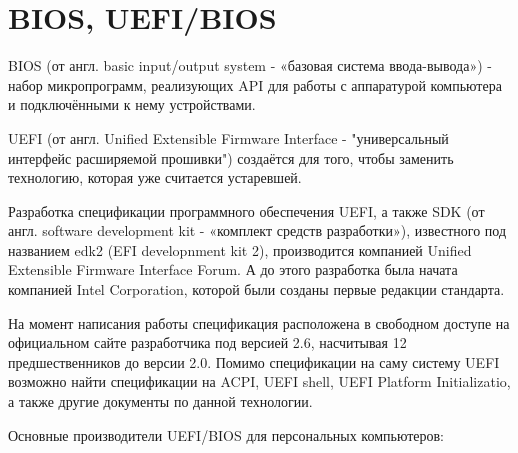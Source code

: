\section{BIOS, UEFI/BIOS}
BIOS (от англ. basic input/output system - «базовая система ввода-вывода») - 
набор микропрограмм,
реализующих API для работы с аппаратурой компьютера и подключёнными к нему устройствами.

UEFI (от англ. Unified Extensible Firmware Interface - "универсальный интерфейс расширяемой прошивки") создаётся для того,
чтобы заменить технологию,
	которая уже считается устаревшей.

Разработка спецификации программного обеспечения UEFI,
а также SDK (от англ. software development kit - «комплект средств разработки»),
	известного под названием edk2 (EFI developnment kit 2),
производится компанией Unified Extensible Firmware Interface Forum. 
А до этого разработка была начата компанией Intel Corporation,
	которой были созданы первые редакции стандарта.

На момент написания работы спецификация расположена в свободном доступе на официальном сайте разработчика под версией 2.6, насчитывая 12 предшественников до версии 2.0.
Помимо спецификации на саму систему UEFI возможно найти спецификации на ACPI, UEFI shell, UEFI Platform Initializatio, а также другие документы по данной технологии.

Основные производители UEFI/BIOS для персональных компьютеров:

